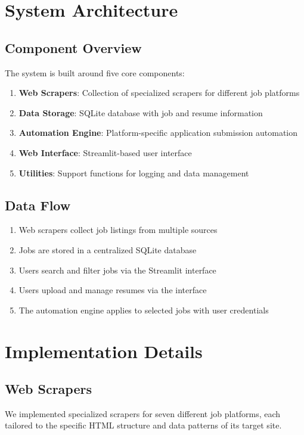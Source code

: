 \documentclass[12pt,a4paper]{article}
\begin{document}
\section{System Architecture}

\subsection{Component Overview}
The system is built around five core components:

\begin{tcolorbox}[colback=backcolour,title=System Components]
\begin{enumerate}
    \item \textbf{Web Scrapers}: Collection of specialized scrapers for different job platforms
    \item \textbf{Data Storage}: SQLite database with job and resume information
    \item \textbf{Automation Engine}: Platform-specific application submission automation
    \item \textbf{Web Interface}: Streamlit-based user interface
    \item \textbf{Utilities}: Support functions for logging and data management
\end{enumerate}
\end{tcolorbox}

\subsection{Data Flow}
\begin{enumerate}
    \item Web scrapers collect job listings from multiple sources
    \item Jobs are stored in a centralized SQLite database
    \item Users search and filter jobs via the Streamlit interface
    \item Users upload and manage resumes via the interface
    \item The automation engine applies to selected jobs with user credentials
\end{enumerate}

\section{Implementation Details}

\subsection{Web Scrapers}
We implemented specialized scrapers for seven different job platforms, each tailored to the specific HTML structure and data patterns of its target site.
\end{document}

